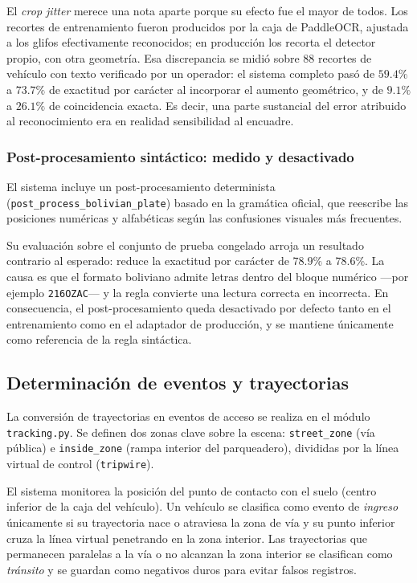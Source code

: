 El \textit{crop jitter} merece una nota aparte porque su efecto fue el mayor de
todos. Los recortes de entrenamiento fueron producidos por la caja de PaddleOCR,
ajustada a los glifos efectivamente reconocidos; en producción los recorta el
detector propio, con otra geometría. Esa discrepancia se midió sobre $88$ recortes
de vehículo con texto verificado por un operador: el sistema completo pasó de
$59{.}4\%$ a $73{.}7\%$ de exactitud por carácter al incorporar el aumento
geométrico, y de $9{.}1\%$ a $26{.}1\%$ de coincidencia exacta. Es decir, una
parte sustancial del error atribuido al reconocimiento era en realidad
sensibilidad al encuadre.

\subsubsection{Post-procesamiento sintáctico: medido y desactivado}

El sistema incluye un post-procesamiento determinista
(\texttt{post\_process\_\allowbreak bolivian\_\allowbreak plate}) basado en la
gramática oficial, que reescribe las posiciones numéricas y alfabéticas según las
confusiones visuales más frecuentes.

Su evaluación sobre el conjunto de prueba congelado arroja un resultado contrario
al esperado: reduce la exactitud por carácter de $78{.}9\%$ a $78{.}6\%$. La causa
es que el formato boliviano admite letras dentro del bloque numérico ---por
ejemplo \texttt{216OZAC}--- y la regla convierte una lectura correcta en
incorrecta. En consecuencia, el post-procesamiento queda desactivado por defecto
tanto en el entrenamiento como en el adaptador de producción, y se mantiene
únicamente como referencia de la regla sintáctica.

\subsection{Determinación de eventos y trayectorias}

La conversión de trayectorias en eventos de acceso se realiza en el módulo
\texttt{tracking.py}. Se definen dos zonas clave sobre la escena: \texttt{street\_zone}
(vía pública) e \texttt{inside\_zone} (rampa interior del parqueadero), divididas por
la línea virtual de control (\texttt{tripwire}).

El sistema monitorea la posición del punto de contacto con el suelo (centro inferior de
la caja del vehículo). Un vehículo se clasifica como evento de \textit{ingreso} únicamente
si su trayectoria nace o atraviesa la zona de vía y su punto inferior cruza la línea
virtual penetrando en la zona interior. Las trayectorias que permanecen paralelas a la
vía o no alcanzan la zona interior se clasifican como \textit{tránsito} y se guardan como
negativos duros para evitar falsos registros.

